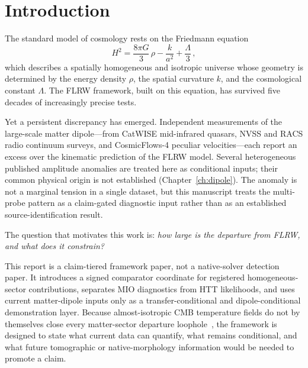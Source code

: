 
\chapter{Introduction}
\label{ch:intro}



The standard model of cosmology rests on the Friedmann
equation
\begin{equation}\label{eq:Friedmann1}
H^2 = \frac{8\pi G}{3}\,\rho
  - \frac{k}{a^2} + \frac{\Lambda}{3}\,,
\end{equation}
which describes a spatially homogeneous and isotropic
universe whose geometry is determined by the energy density
$\rho$, the spatial curvature $k$, and the cosmological
constant $\Lambda$.  The FLRW framework, built on this
equation, has survived five decades of increasingly precise
tests.

Yet a persistent discrepancy has emerged.  Independent
measurements of the large-scale matter dipole---from CatWISE
mid-infrared quasars, NVSS and RACS radio continuum surveys,
and CosmicFlows-4 peculiar velocities---each report an excess
over the kinematic prediction of the FLRW model.  Several
heterogeneous published amplitude anomalies are treated here as
conditional inputs; their common physical origin is not
established (Chapter~\ref{ch:dipole}).  The anomaly is not a
marginal tension in a single dataset, but this manuscript treats
the multi-probe pattern as a claim-gated diagnostic input rather
than as an established source-identification result.

The question that motivates this work is: \emph{how large is
the departure from FLRW, and what does it constrain?}

This report is a claim-tiered framework paper, not a native-solver
detection paper.  It introduces a signed comparator coordinate for
registered homogeneous-sector contributions, separates MIO diagnostics
from HTT likelihoods,
and uses current matter-dipole inputs only as a transfer-conditional
and dipole-conditional demonstration layer.  Because almost-isotropic
CMB temperature fields do not by themselves close every matter-sector
departure loophole~\cite{Nilsson1999AlmostIsotropic}, the framework is
designed to state what current data can quantify, what remains
conditional, and what future tomographic or native-morphology
information would be needed to promote a claim.

